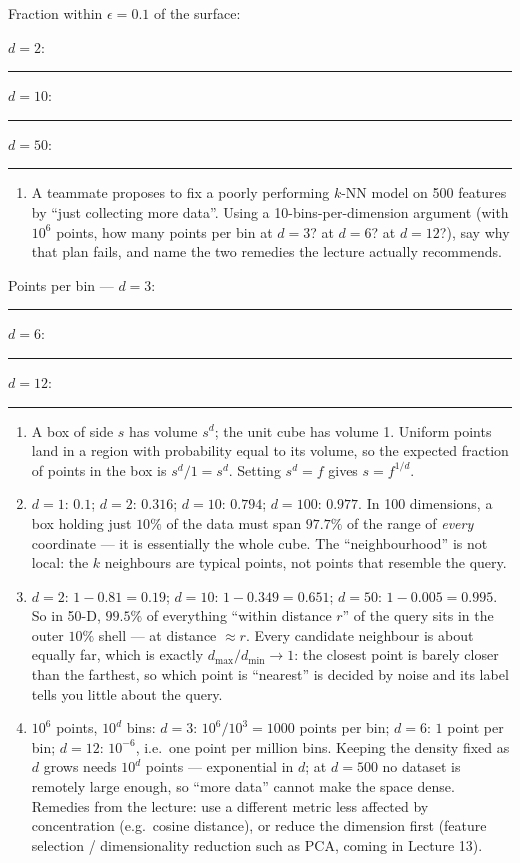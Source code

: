 \documentclass[
  11pt,
]{article}
\providecommand{\tightlist}{%
  \setlength{\itemsep}{0pt}\setlength{\parskip}{0pt}}
\newcommand{\answerspace}[1]{\par\vspace*{#1}}  %
\newcommand{\blank}[1][1.2in]{\rule{#1}{0.4pt}}
\begin{document}
Fraction within \(\epsilon = 0.1\) of the surface:

\(d = 2\): \blank[0.8in]\quad \(d = 10\): \blank[0.8in]\quad \(d = 50\):
\blank[0.8in]

\answerspace{2.8in}

\begin{enumerate}
\def\labelenumi{(\alph{enumi})}
\setcounter{enumi}{3}
\tightlist
\item
  A teammate proposes to fix a poorly performing \(k\)-NN model on 500
  features by ``just collecting more data''. Using a
  10-bins-per-dimension argument (with \(10^6\) points, how many points
  per bin at \(d = 3\)? at \(d = 6\)? at \(d = 12\)?), say why that plan
  fails, and name the two remedies the lecture actually recommends.
\end{enumerate}

Points per bin --- \(d = 3\): \blank[0.8in]\quad \(d = 6\):
\blank[0.8in]\quad \(d = 12\): \blank[0.8in]

\answerspace{1.8in}

\begin{solutionbox}

\begin{enumerate}
\def\labelenumi{(\alph{enumi})}
\item
  A box of side \(s\) has volume \(s^d\); the unit cube has volume 1.
  Uniform points land in a region with probability equal to its volume,
  so the expected fraction of points in the box is \(s^d/1 = s^d\).
  Setting \(s^d = f\) gives \(s = f^{1/d}\).
\item
  \(d = 1\): \(0.1\); \(d = 2\): \(0.316\); \(d = 10\): \(0.794\);
  \(d = 100\): \(0.977\). In 100 dimensions, a box holding just \(10\%\)
  of the data must span \(97.7\%\) of the range of \emph{every}
  coordinate --- it is essentially the whole cube. The ``neighbourhood''
  is not local: the \(k\) neighbours are typical points, not points that
  resemble the query.
\item
  \(d = 2\): \(1 - 0.81 = 0.19\); \(d = 10\): \(1 - 0.349 = 0.651\);
  \(d = 50\): \(1 - 0.005 =
  0.995\). So in 50-D, \(99.5\%\) of everything ``within distance
  \(r\)'' of the query sits in the outer \(10\%\) shell --- at distance
  \(\approx r\). Every candidate neighbour is about equally far, which
  is exactly \(d_{\max}/d_{\min} \to 1\): the closest point is barely
  closer than the farthest, so which point is ``nearest'' is decided by
  noise and its label tells you little about the query.
\item
  \(10^6\) points, \(10^d\) bins: \(d = 3\): \(10^6/10^3 = 1000\) points
  per bin; \(d = 6\): \(1\) point per bin; \(d = 12\): \(10^{-6}\),
  i.e.~one point per million bins. Keeping the density fixed as \(d\)
  grows needs \(10^d\) points --- exponential in \(d\); at \(d = 500\)
  no dataset is remotely large enough, so ``more data'' cannot make the
  space dense. Remedies from the lecture: use a different metric less
  affected by concentration (e.g.~cosine distance), or reduce the
  dimension first (feature selection / dimensionality reduction such as
  PCA, coming in Lecture 13).
\end{enumerate}

\end{solutionbox}
\end{document}
